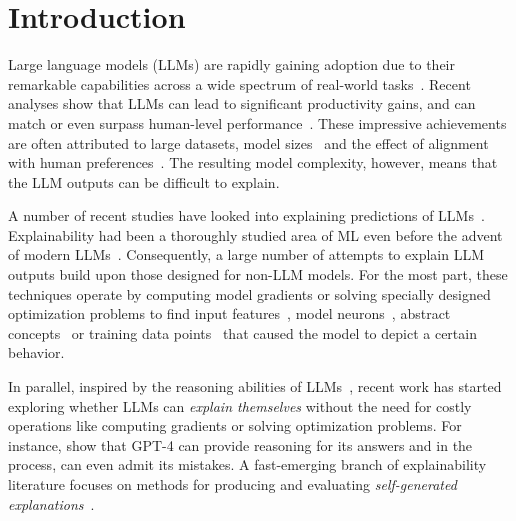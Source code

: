 \section{Introduction}
\label{sec:intro}

Large language models (LLMs) are rapidly gaining adoption due to their remarkable capabilities across a wide spectrum of real-world tasks~\citep{bommasani2021opportunities, wei2022emergent, maynez2023benchmarking,bubeck2023sparks}.
Recent analyses show that LLMs can lead to significant productivity gains, and can match or even surpass human-level performance~\cite{luo2024large,yang2024harnessing,peng2023impact}.
These impressive achievements are often attributed to large datasets, model sizes~\cite{kaplan2020scaling,hoffmann2022empirical} and the effect of alignment with human preferences~\cite{guo2025deepseek,ouyang2022training}. 
The resulting model complexity, however, means that the LLM outputs can be difficult to explain.


A number of recent studies have looked into explaining predictions of LLMs~\citep[inter alia]{templeton2024scaling,zhao2024explainability,bricken2023monosemanticity}. Explainability had been a thoroughly studied area of ML even before the advent of modern LLMs~\cite{gilpin2018explaining,10.1145/3236009}. Consequently, a large number of attempts to explain LLM outputs build upon those designed for non-LLM models. For the most part, these techniques operate by computing model gradients or solving specially designed optimization problems to find input features~\cite{cohen2025contextcite}, model neurons~\cite{templeton2024scaling,meng2022locating}, abstract concepts~\cite{kim2018interpretability,xu2025uncovering} or training data points~\cite{park2023trak} that caused the model to depict a certain behavior. 

In parallel, inspired by the reasoning abilities of LLMs~\cite{wei2022chain}, recent work has started exploring whether LLMs can \textit{explain themselves} without the need for costly operations like computing gradients or solving optimization problems. For instance, \citet{bubeck2023sparks} show that GPT-4 can provide reasoning for its answers and in the process, can even admit its mistakes. 
A fast-emerging branch of explainability literature focuses on methods for producing and evaluating \textit{self-generated explanations}~\cite{tanneru2024quantifying,turpin2023language,agarwal2024faithfulness,lanham2023measuring, guo2025deepseek}.

